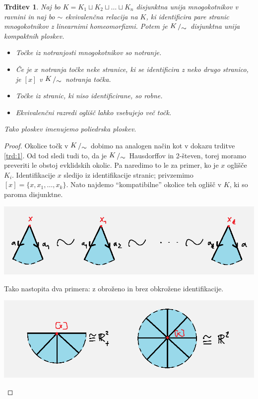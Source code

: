 \documentclass[10pt, a4paper]{article}
\newtheorem{trditev}[izr]{Trditev}
\newenvironment{noticeC}{%
  \tcolorbox[%
  notitle,
  empty,
  enhanced,  %
  breakable,
  coltext=black, 
  fontupper=\rmfamily,
  noparskip,
  sharp corners,
  boxrule=-1pt,  %
  frame hidden,
  left=7pt,  %
  right=7pt,
  top=5pt,
  bottom=5pt,
  before skip=2.5ex plus 2pt,
  after skip=2.5ex plus 2pt,
  overlay unbroken and last={%
  },
  ]}
{\endtcolorbox}
\newenvironment{dokaz}%
  {\begin{noticeC}\begin{proof}}%
  {\end{proof}\end{noticeC}}
\newcommand{\quot}[2]{{\raisebox{0.1em}{$#1$}\left/\raisebox{-0.2em}{$#2$}\right.}}
\begin{document}
\begin{trditev}
  Naj bo $K = K_1 \sqcup K_2 \sqcup \dots \sqcup K_n$ disjunktna unija mnogokotnikov v ravnini
  in naj bo $\sim$ ekvivalenčna relacija na $K$, ki identificira pare stranic 
  mnogokotnikov z linearnimi homeomorfizmi.
  Potem je $\quot{K}{\sim}$ disjunktna unija kompaktnih ploskev.
  \begin{itemize}
    \item Točke iz notranjosti mnogokotnikov so notranje.
    \item Če je $x$ notranja točke neke stranice, ki se identificira z neko drugo stranico,
    je $[x]$ v $\quot{K}{\sim}$ notranja točka.
    \item Točke iz stranic, ki niso identificirane, so robne.
    \item Ekvivalenčni razredi oglišč lahko vsebujejo več točk.
  \end{itemize}
  Tako ploskev imenujemo poliedrska ploskev.
\end{trditev}

\begin{dokaz}
  Okolice točk v $\quot{K}{\sim}$ dobimo na analogen način kot 
  v dokazu trditve \ref{trd:1}. Od tod sledi tudi to,
  da je $\quot{K}{\sim}$ Hausdorffov in 2-števen, torej moramo 
  preveriti le obstoj evklidskih okolic.
  Pa naredimo to le za primer, ko je $x$ oglišče $K_i$.
  Identifikacije $x$ sledijo iz identifikacije stranic; privzemimo 
  $[x] = \{x, x_1, \dots, x_k\}$. Nato najdemo "`kompatibilne"'
  okolice teh oglišč v $K$, ki so paroma disjunktne.
  \begin{center}
    \includegraphics[scale=0.7]{dokaz6.png}
  \end{center}
  Tako nastopita dva primera: z obroženo in brez obkrožene identifikacije.
  \begin{center}
    \includegraphics[scale=0.6]{dokaz7.png}
  \end{center}  
\end{dokaz}
\end{document}
